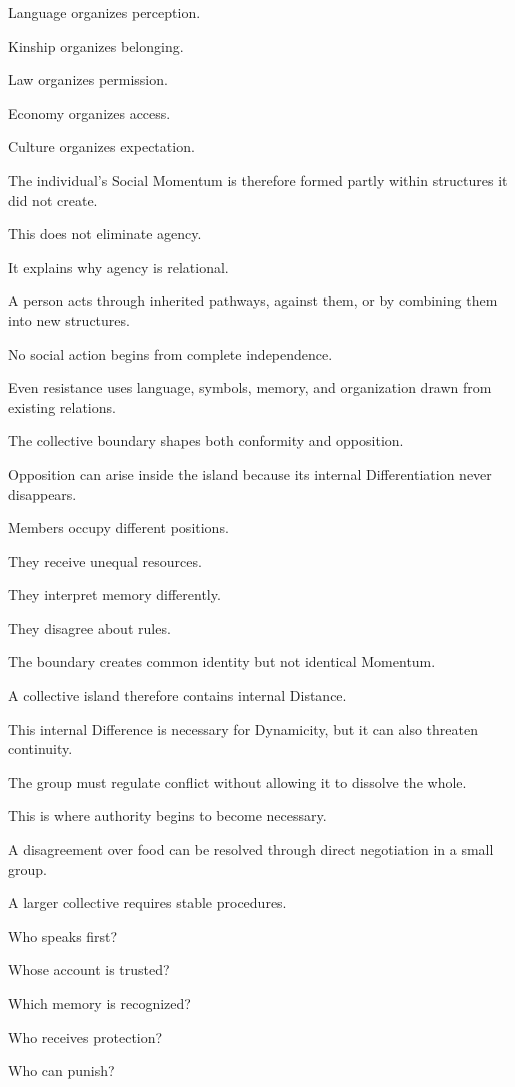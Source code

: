 Language organizes perception.

Kinship organizes belonging.

Law organizes permission.

Economy organizes access.

Culture organizes expectation.

The individual’s Social Momentum is therefore formed partly within structures it did not create.

This does not eliminate agency.

It explains why agency is relational.

A person acts through inherited pathways, against them, or by combining them into new structures.

No social action begins from complete independence.

Even resistance uses language, symbols, memory, and organization drawn from existing relations.

The collective boundary shapes both conformity and opposition.

Opposition can arise inside the island because its internal Differentiation never disappears.

Members occupy different positions.

They receive unequal resources.

They interpret memory differently.

They disagree about rules.

The boundary creates common identity but not identical Momentum.

A collective island therefore contains internal Distance.

This internal Difference is necessary for Dynamicity, but it can also threaten continuity.

The group must regulate conflict without allowing it to dissolve the whole.

This is where authority begins to become necessary.

A disagreement over food can be resolved through direct negotiation in a small group.

A larger collective requires stable procedures.

Who speaks first?

Whose account is trusted?

Which memory is recognized?

Who receives protection?

Who can punish?


